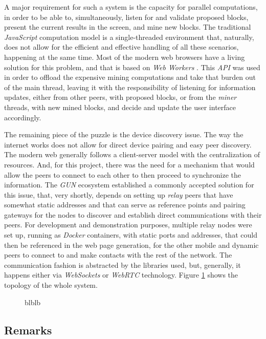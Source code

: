 \documentclass[journal]{IEEEtran}
\begin{document}
A major requirement for such a system is the capacity for parallel computations, 
in order to be able to, simultaneously, listen for and validate proposed blocks, 
present the current results in the screen, and mine new blocks. The traditional 
\emph{JavaScript} computation model is a single-threaded environment that, naturally,
does not allow for the efficient and effective handling of all these scenarios, happening
at the same time. Most of the modern web browsers have a living solution for this problem, 
and that is based on \emph{Web Workers} \cite{webworkers}. This \emph{API} was used in order to offload
the expensive mining computations and take that burden out of the main thread, leaving it
with the responsibility of listening for information updates, either from other peers, with
proposed blocks, or from the \emph{miner} threads, with new mined blocks, and decide and update
the user interface accordingly.

The remaining piece of the puzzle is the device discovery issue. The way the internet works does not
allow for direct device pairing and easy peer discovery. The modern web generally follows a 
client-server model with the centralization of resources. And, for this project, there was the need
for a mechanism that would allow the peers to connect to each other to then proceed to synchronize
the information. The \emph{GUN} ecosystem established a commonly accepted solution for this issue, that, 
very shortly, depends on setting up \emph{relay} peers that have somewhat static addresses and that can 
serve as reference points and pairing gateways for the nodes to discover and establish direct communications 
with their peers. For development and demonstration purposes, multiple relay nodes were set up, running 
as \emph{Docker} containers, with static ports and addresses, that could then be referenced in the web 
page generation, for the other mobile and dynamic peers to connect to and make contacts with the rest of the network.
The communication fashion is abstracted by the libraries used, but, generally, it happens either via \emph{WebSockets}
or \emph{WebRTC} technology. Figure \ref{fig:in-browser-pow-topology} shows the topology of the whole system.

\begin{figure}[h]
  \centering
  \captionsetup{justification=centering}
  \caption{blblb}
  \label{fig:in-browser-pow-topology}
\end{figure}

\subsection{Remarks}
\end{document}
